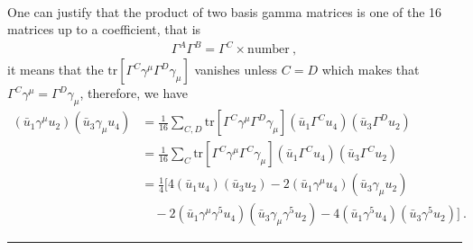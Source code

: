 \documentclass[12pt]{report}
\numberwithin{problemname}{chapter}
\newenvironment{solution}{\vspace{1em}\par\noindent{\large\textbf{\textsc{Solution}}}\par}{\vspace{1em}\hrule}
\begin{document}
\begin{solution}
\begin{enumerate}[(a)]
\begin{align}
    \end{align}
    One can justify that the product of two basis gamma matrices is one of the 16 matrices up to a coefficient, that is
    \begin{align}
        \Gamma^A\Gamma^B=\Gamma^C\times\text{number}\ ,
    \end{align}
    it means that the $\text{tr}[\Gamma^C\gamma^{\mu}\Gamma^D\gamma_{\mu}]$ vanishes unless $C=D$ which makes that $\Gamma^C\gamma^{\mu}=\Gamma^D\gamma_{\mu}$, therefore, we have
    \begin{align}
        (\bar{u}_1\gamma^{\mu} u_2)(\bar{u}_3\gamma_{\mu} u_4)&=\frac{1}{16}\sum_{C,D}\text{tr}[\Gamma^C\gamma^{\mu}\Gamma^D\gamma_{\mu}](\bar{u}_1\Gamma^C u_4)(\bar{u}_3\Gamma^D u_2) \nonumber \\
        &=\frac{1}{16}\sum_{C}\text{tr}[\Gamma^C\gamma^{\mu}\Gamma^C\gamma_{\mu}](\bar{u}_1\Gamma^C u_4)(\bar{u}_3\Gamma^C u_2) \nonumber \\
        &=\frac{1}{4}\bigg[4(\bar{u}_1u_4)(\bar{u}_3u_2)-2(\bar{u}_1\gamma^{\mu}u_4)(\bar{u}_3\gamma_{\mu}u_2) \nonumber \\
        &\quad -2(\bar{u}_1\gamma^{\mu}\gamma^5u_4)(\bar{u}_3\gamma_{\mu}\gamma^5u_2)-4(\bar{u}_1\gamma^5u_4)(\bar{u}_3\gamma^5u_2)\bigg]\ .
    \end{align}
\end{enumerate}
\end{solution}
\end{document}

